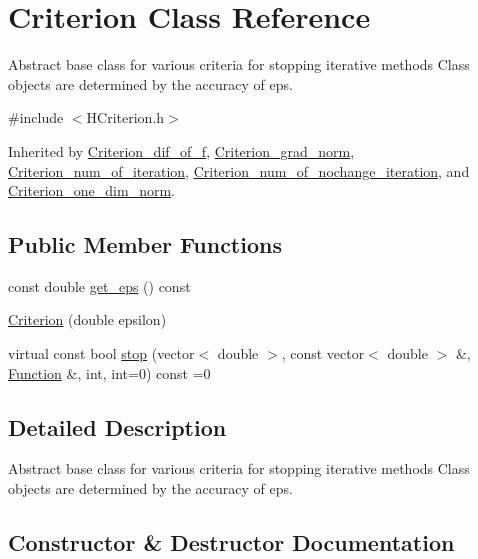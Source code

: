 \hypertarget{class_criterion}{}\section{Criterion Class Reference}
\label{class_criterion}


Abstract base class for various criteria for stopping iterative methods Class objects are determined by the accuracy of eps.  




{\ttfamily \#include $<$H\+Criterion.\+h$>$}



Inherited by \hyperlink{class_criterion__dif__of__f}{Criterion\+\_\+dif\+\_\+of\+\_\+f}, \hyperlink{class_criterion__grad__norm}{Criterion\+\_\+grad\+\_\+norm}, \hyperlink{class_criterion__num__of__iteration}{Criterion\+\_\+num\+\_\+of\+\_\+iteration}, \hyperlink{class_criterion__num__of__nochange__iteration}{Criterion\+\_\+num\+\_\+of\+\_\+nochange\+\_\+iteration}, and \hyperlink{class_criterion__one__dim__norm}{Criterion\+\_\+one\+\_\+dim\+\_\+norm}.

\subsection*{Public Member Functions}
\begin{DoxyCompactItemize}
\item 
const double \hyperlink{class_criterion_aa0bb13b321141cb530b259e190606f81}{get\+\_\+eps} () const
\item 
\hyperlink{class_criterion_afe28663dd86d473ed813aaf7550bfa04}{Criterion} (double epsilon)
\item 
virtual const bool \hyperlink{class_criterion_aee3e2148c665c72c50c2f870a3ca8cdc}{stop} (vector$<$ double $>$, const vector$<$ double $>$ \&, \hyperlink{class_function}{Function} \&, int, int=0) const =0
\end{DoxyCompactItemize}


\subsection{Detailed Description}
Abstract base class for various criteria for stopping iterative methods Class objects are determined by the accuracy of eps. 

\subsection{Constructor \& Destructor Documentation}
\mbox{\label{class_criterion_afe28663dd86d473ed813aaf7550bfa04}} 
